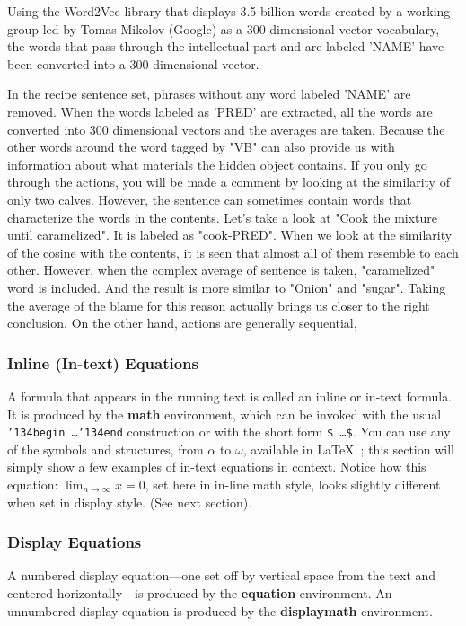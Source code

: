 Using the Word2Vec library that displays 3.5 billion words created by a working group led by Tomas Mikolov (Google) as a 300-dimensional vector vocabulary, the words that pass through the intellectual part and are labeled 'NAME' have been converted into a 300-dimensional vector.

In the recipe sentence set, phrases without any word labeled 'NAME' are removed. When the words labeled as 'PRED' are extracted, all the words are converted into 300 dimensional vectors and the averages are taken. Because the other words around the word tagged by "VB" can also provide us with information about what materials the hidden object contains. If you only go through the actions, you will be made a comment by looking at the similarity of only two calves. However, the sentence can sometimes contain words that characterize the words in the contents. Let's take a look at "Cook the mixture until caramelized". It is labeled as "cook-PRED". When we look at the similarity of the cosine with the contents, it is seen that almost all of them resemble to each other. However, when the complex average of sentence is taken, "caramelized" word is included. And the result is more similar to "Onion" and "sugar". Taking the average of the blame for this reason actually brings us closer to the right conclusion. On the other hand, actions are generally sequential,  

\subsubsection{Inline (In-text) Equations}
A formula that appears in the running text is called an
inline or in-text formula.  It is produced by the
\textbf{math} environment, which can be
invoked with the usual \texttt{{\char'134}begin\,\ldots{\char'134}end}
construction or with the short form \texttt{\$\,\ldots\$}. You
can use any of the symbols and structures,
from $\alpha$ to $\omega$, available in
\LaTeX~\cite{Lamport:LaTeX}; this section will simply show a
few examples of in-text equations in context. Notice how
this equation:
\begin{math}
  \lim_{n\rightarrow \infty}x=0
\end{math},
set here in in-line math style, looks slightly different when
set in display style.  (See next section).



\subsubsection{Display Equations}
A numbered display equation---one set off by vertical space from the
text and centered horizontally---is produced by the \textbf{equation}
environment. An unnumbered display equation is produced by the
\textbf{displaymath} environment.

